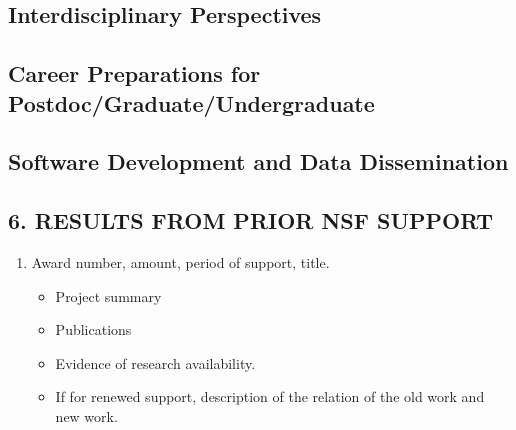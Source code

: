 \documentclass[../preamble.tex]{subfiles}
\begin{document}
\subsection{Interdisciplinary Perspectives}
\subsection{Career Preparations for Postdoc/Graduate/Undergraduate}
\subsection{Software Development and Data Dissemination}

%
%
\subsection{6. RESULTS FROM PRIOR NSF SUPPORT} %
%
% 
%
%
\begin{enumerate}
    \item Award number, amount, period of support, title. 
    \begin{itemize}
        \item      Project summary
        \item      Publications
        \item      Evidence of research availability.
        \item      If for renewed support, description of the relation of the old work and new work.
    \end{itemize}
     
\end{enumerate}

\newpage

%
%


\AtBeginShipout{%
\AtBeginShipoutDiscard
}
\renewcommand\refname{References Cited}






\end{document}
